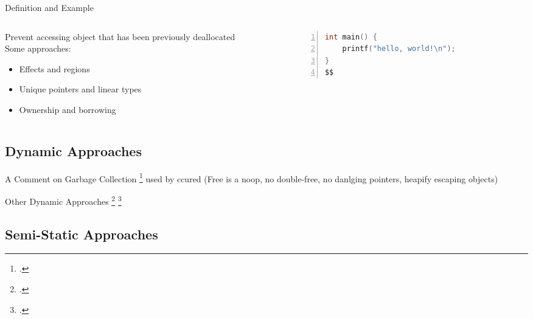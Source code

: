 \documentclass[aspectratio=169]{beamer}
\begin{document}
\begin{frame}[fragile]{Definition and Example}
  \footnotesize
  \begin{columns}[T]
    \begin{column}{0.45\textwidth}
        Prevent accessing object that has been previously deallocated
        \\
        Some approaches:
        \begin{itemize}
            \item Effects and regions
            \item Unique pointers and linear types
            \item Ownership and borrowing
        \end{itemize}
    \end{column}
    \begin{column}{0.45\textwidth}
%      
       \begin{lstlisting}[language=C,numbers=left,mathescape,basicstyle={\footnotesize\ttfamily}]
int main() {
    printf("hello, world!\n");
}
$$
        \end{lstlisting}
    \end{column}
  \end{columns}
\end{frame}

\subsection{Dynamic Approaches}
\begin{frame}{A Comment on Garbage Collection}
    \footcite{boehm_garbage_1988}
    used by ccured (Free is a noop, no double-free, no danlging pointers, heapify escaping objects)
\end{frame}
\begin{frame}{Other Dynamic Approaches}
    \footcite{austin_efficient_1994}
    \footcite{west_cuckoo:_2005}
\end{frame}

\subsection{Semi-Static Approaches}
\end{document}
